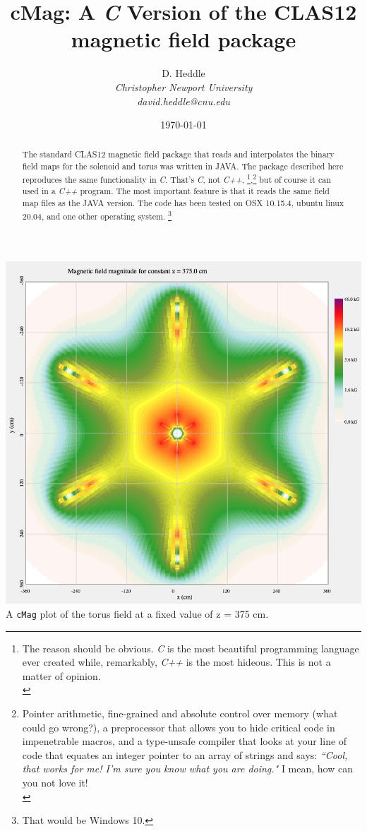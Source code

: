 \documentclass{article}
\title{\textbf{cMag:} A \emph{C} Version of the CLAS12 magnetic field package}
\author{D. Heddle  \\
	\emph{Christopher Newport University}  \\
         \emph{david.heddle@cnu.edu}\\
	}
\date{\today}
\begin{document}
\maketitle
\begin{abstract}
   The standard CLAS12 magnetic field package that reads and interpolates the binary field maps for the solenoid and torus was written in JAVA. The package described here reproduces the same functionality in \emph{C}. That's  \emph{C}, not \emph{C++}, 
\footnote{The reason should be obvious. \emph{C} is the most beautiful programming language ever created while, remarkably, \emph{C++} is the most hideous. This is not a matter of opinion.\\},\footnote{Pointer arithmetic, fine-grained and absolute control over memory (what could go wrong?), a preprocessor that allows you to hide critical code in impenetrable macros, and a type-unsafe compiler that looks at your line of code that equates an integer pointer to an array of strings and says: \textit{``Cool, that works for me! I'm sure you know what you are doing."} I mean, how can you not love it!\\}
 but of course it can used in a \emph{C++} program. The most important feature is that it reads the same field map files as the JAVA version. The code has been tested on OSX 10.15.4, ubuntu linux 20.04, and one other operating system. \footnote[666]{That would be Windows 10.}


\end{abstract}
\vspace{0.8cm}

\begin{center}
\includegraphics[scale=0.4]{fig1}
\vspace{0.2 cm}
\\A  \texttt{cMag} plot of the torus field at a fixed value of z = 375 cm.
\end{center}
\newpage
\end{document}
